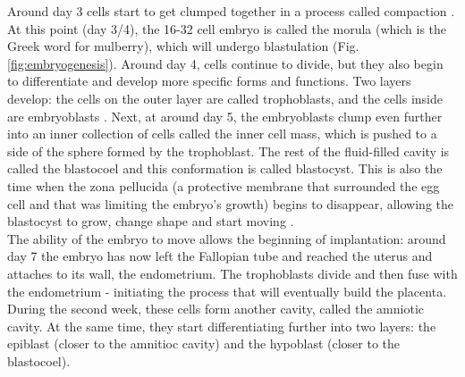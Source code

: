 Around day 3 cells start to get clumped together in a process called compaction \cite{iwata2014analysis}.
At this point (day 3/4), the 16-32 cell embryo is called the morula (which is the Greek word for mulberry), which will undergo blastulation \cite{wong2010non} (Fig. \ref{fig:embryogenesis}).
Around day 4, cells continue to divide, but they also begin to differentiate and develop more specific forms and functions.
Two layers develop: the cells on the outer layer are called trophoblasts, and the cells inside are embryoblasts
\cite{petropoulos2016single, niakan2013analysis}. 
Next, at around day 5, the embryoblasts clump even further into an inner collection of cells called the inner cell mass, which is pushed to a side of the sphere formed by the trophoblast.
The rest of the fluid-filled cavity is called the blastocoel and this conformation is called blastocyst.
This is also the time when the zona pellucida (a protective membrane that surrounded the egg cell and that was limiting the embryo's growth) begins to disappear, allowing the blastocyst to grow, change shape and start moving \cite{larsen2001human}.\\

The ability of the embryo to move allows the beginning of implantation: around day 7 the embryo has now left the Fallopian tube and reached the uterus and attaches to its wall, the endometrium.
The trophoblasts divide and then fuse with the endometrium -
initiating the process that 
will eventually build the placenta.\\

During the second week, these cells form another cavity, called the amniotic cavity. 
At the same time, they start differentiating further into two layers: the epiblast (closer to the amnitioc cavity) and the hypoblast (closer to the blastocoel). 


